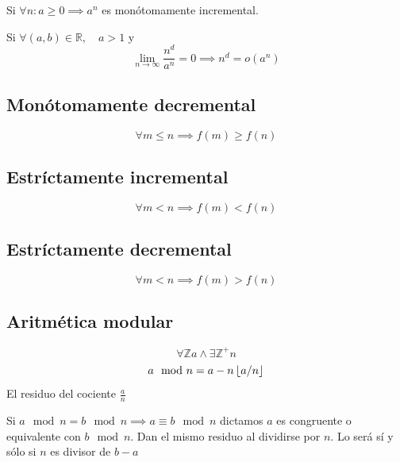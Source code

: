 \begin{definition}
	Si $\forall n: a\ge0\implies a^n$ es monótomamente incremental.

	Si $\forall(a,b) \in \mathbb R,\quad a>1$ y
	$$ \lim_{n\to\infty}\frac{n^d}{a^n}=0 \implies n^d=o(a^n)$$
\end{definition}

\subsection{Monótomamente decremental}
\begin{definition}
	$$\forall 	 m\le   n \implies  f(m)\ge  f(n)$$
\end{definition}
\subsection{Estríctamente incremental}
\begin{definition}
	$$\forall 	 m<   n \implies  f(m)<  f(n)$$
\end{definition}
\subsection{Estríctamente decremental}
\begin{definition}
	$$\forall 	 m<   n \implies  f(m)>  f(n)$$
\end{definition}

\subsection{Aritmética modular}
\begin{theorem}
	$$\forall \mathbb Z a \land \exists\mathbb Z^+ n$$
	$$ a\mod{n}=a-n\left\lfloor a/n \right\rfloor$$
	El residuo del cociente $\frac an$
\end{theorem}
\begin{theorem}[Equivalencias]
	Si $a\mod n = b\mod n\implies a\equiv b \mod n$
	dictamos $a$ es congruente o equivalente con $b\mod n$. Dan el mismo residuo al dividirse por $n$. Lo será sí y sólo si $n$ es divisor de $b-a$
\end{theorem}

